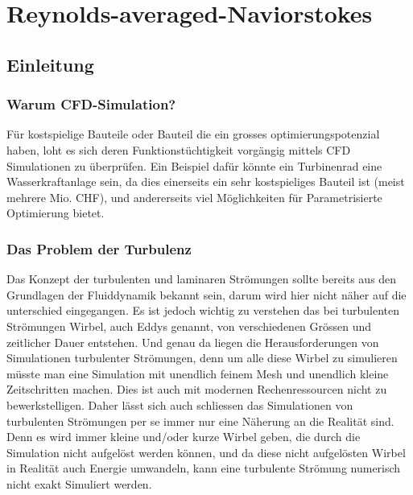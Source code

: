 %
%
%
%
\chapter{Reynolds-averaged-Naviorstokes \label{chapter:reynolds}}
\begin{refsection}

\section{Einleitung}

\subsection{Warum CFD-Simulation?}

Für kostspielige Bauteile oder Bauteil die ein grosses optimierungspotenzial haben,
loht es sich deren Funktionstüchtigkeit vorgängig mittels CFD Simulationen zu überprüfen.
Ein Beispiel dafür könnte ein Turbinenrad eine Wasserkraftanlage sein,
da dies einerseits ein sehr kostspieliges Bauteil ist (meist mehrere Mio. CHF),
und andererseits viel Möglichkeiten für Parametrisierte Optimierung bietet.

\subsection{Das Problem der Turbulenz}

Das Konzept der turbulenten und laminaren Strömungen sollte bereits aus den Grundlagen der Fluiddynamik bekannt sein, darum wird hier nicht näher auf die unterschied eingegangen.
Es ist jedoch wichtig zu verstehen das bei turbulenten Strömungen Wirbel, auch Eddys genannt, von verschiedenen Grössen und zeitlicher Dauer entstehen.
Und genau da liegen die Herausforderungen von Simulationen turbulenter Strömungen,
denn um alle diese Wirbel zu simulieren müsste man eine Simulation mit unendlich feinem Mesh und unendlich kleine Zeitschritten machen.
Dies ist auch mit modernen Rechenressourcen nicht zu bewerkstelligen.
Daher lässt sich auch schliessen das Simulationen von turbulenten Strömungen per se immer nur eine Näherung an die Realität sind.
Denn es wird immer kleine und/oder kurze Wirbel geben, die durch die Simulation nicht aufgelöst werden können,
und da diese nicht aufgelösten Wirbel in Realität auch Energie umwandeln, kann eine turbulente Strömung numerisch nicht exakt Simuliert werden.



\end{refsection}
